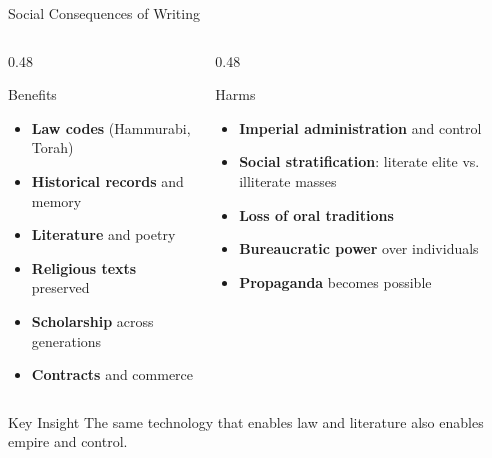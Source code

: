\documentclass[aspectratio=169,11pt]{beamer}
\begin{document}
\begin{frame}{Social Consequences of Writing}
\begin{columns}
\begin{column}{0.48\textwidth}
\begin{block}{\faThumbsUp\hspace{0.3em}Benefits}
\begin{itemize}
  \item \textbf{Law codes} (Hammurabi, Torah)
  \item \textbf{Historical records} and memory
  \item \textbf{Literature} and poetry
  \item \textbf{Religious texts} preserved
  \item \textbf{Scholarship} across generations
  \item \textbf{Contracts} and commerce
\end{itemize}
\end{block}
\end{column}

\begin{column}{0.48\textwidth}
\begin{alertblock}{\faThumbsDown\hspace{0.3em}Harms}
\begin{itemize}
  \item \textbf{Imperial administration} and control
  \item \textbf{Social stratification}: literate elite vs. illiterate masses
  \item \textbf{Loss of oral traditions}
  \item \textbf{Bureaucratic power} over individuals
  \item \textbf{Propaganda} becomes possible
\end{itemize}
\end{alertblock}
\end{column}
\end{columns}

\vspace{0.5em}
\begin{exampleblock}{Key Insight}
The same technology that enables law and literature also enables empire and control.
\end{exampleblock}
\end{frame}
\end{document}
